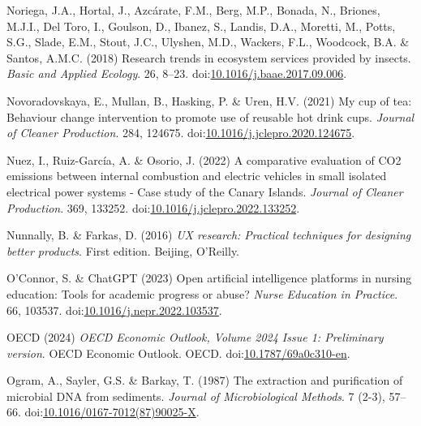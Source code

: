 \documentclass[
  letterpaper,
  DIV=11,
  numbers=noendperiod]{scrartcl}
\newlength{\cslhangindent}
\newenvironment{CSLReferences}[2] %
 {\begin{list}{}{%
  \setlength{\itemindent}{0pt}
  \setlength{\leftmargin}{0pt}
  \setlength{\parsep}{0pt}
  \ifodd #1
   \setlength{\leftmargin}{\cslhangindent}
   \setlength{\itemindent}{-1\cslhangindent}
  \fi
  \setlength{\itemsep}{#2\baselineskip}}}
 {\end{list}}
\begin{document}
\begin{CSLReferences}{0}{1}
Noriega, J.A., Hortal, J., Azcárate, F.M., Berg, M.P., Bonada, N.,
Briones, M.J.I., Del Toro, I., Goulson, D., Ibanez, S., Landis, D.A.,
Moretti, M., Potts, S.G., Slade, E.M., Stout, J.C., Ulyshen, M.D.,
Wackers, F.L., Woodcock, B.A. \& Santos, A.M.C. (2018) Research trends
in ecosystem services provided by insects. \emph{Basic and Applied
Ecology}. 26, 8--23.
doi:\href{https://doi.org/10.1016/j.baae.2017.09.006}{10.1016/j.baae.2017.09.006}.

Novoradovskaya, E., Mullan, B., Hasking, P. \& Uren, H.V. (2021) My cup
of tea: {Behaviour} change intervention to promote use of reusable hot
drink cups. \emph{Journal of Cleaner Production}. 284, 124675.
doi:\href{https://doi.org/10.1016/j.jclepro.2020.124675}{10.1016/j.jclepro.2020.124675}.

Nuez, I., Ruiz-García, A. \& Osorio, J. (2022) A comparative evaluation
of {CO2} emissions between internal combustion and electric vehicles in
small isolated electrical power systems - {Case} study of the {Canary
Islands}. \emph{Journal of Cleaner Production}. 369, 133252.
doi:\href{https://doi.org/10.1016/j.jclepro.2022.133252}{10.1016/j.jclepro.2022.133252}.

Nunnally, B. \& Farkas, D. (2016) \emph{{UX} research: Practical
techniques for designing better products}. First edition. Beijing,
O'Reilly.

O'Connor, S. \& ChatGPT (2023) Open artificial intelligence platforms in
nursing education: {Tools} for academic progress or abuse? \emph{Nurse
Education in Practice}. 66, 103537.
doi:\href{https://doi.org/10.1016/j.nepr.2022.103537}{10.1016/j.nepr.2022.103537}.

OECD (2024) \emph{{OECD Economic Outlook}, {Volume} 2024 {Issue} 1:
{Preliminary} version}. {OECD Economic Outlook}. OECD.
doi:\href{https://doi.org/10.1787/69a0c310-en}{10.1787/69a0c310-en}.

Ogram, A., Sayler, G.S. \& Barkay, T. (1987) The extraction and
purification of microbial {DNA} from sediments. \emph{Journal of
Microbiological Methods}. 7 (2-3), 57--66.
doi:\href{https://doi.org/10.1016/0167-7012(87)90025-X}{10.1016/0167-7012(87)90025-X}.


\end{CSLReferences}
\end{document}
